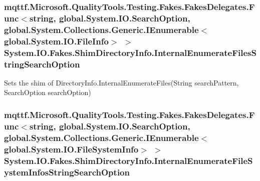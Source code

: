 \hypertarget{class_system_1_1_i_o_1_1_fakes_1_1_shim_directory_info_a39884c624b95796a109284b2d06c15fa}{
\subsubsection[{Internal\-Enumerate\-Files\-String\-Search\-Option}]{\setlength{\rightskip}{0pt plus 5cm}mqttf.\-Microsoft.\-Quality\-Tools.\-Testing.\-Fakes.\-Fakes\-Delegates.\-Func$<$string, global.\-System.\-I\-O.\-Search\-Option, global.\-System.\-Collections.\-Generic.\-I\-Enumerable$<$global.\-System.\-I\-O.\-File\-Info$>$ $>$ System.\-I\-O.\-Fakes.\-Shim\-Directory\-Info.\-Internal\-Enumerate\-Files\-String\-Search\-Option\hspace{0.3cm}{\ttfamily [set]}}}\label{class_system_1_1_i_o_1_1_fakes_1_1_shim_directory_info_a39884c624b95796a109284b2d06c15fa}


Sets the shim of Directory\-Info.\-Internal\-Enumerate\-Files(\-String search\-Pattern, Search\-Option search\-Option)

\hypertarget{class_system_1_1_i_o_1_1_fakes_1_1_shim_directory_info_ae33c09c51b32b3030587794fb99aa7b1}{
\subsubsection[{Internal\-Enumerate\-File\-System\-Infos\-String\-Search\-Option}]{\setlength{\rightskip}{0pt plus 5cm}mqttf.\-Microsoft.\-Quality\-Tools.\-Testing.\-Fakes.\-Fakes\-Delegates.\-Func$<$string, global.\-System.\-I\-O.\-Search\-Option, global.\-System.\-Collections.\-Generic.\-I\-Enumerable$<$global.\-System.\-I\-O.\-File\-System\-Info$>$ $>$ System.\-I\-O.\-Fakes.\-Shim\-Directory\-Info.\-Internal\-Enumerate\-File\-System\-Infos\-String\-Search\-Option\hspace{0.3cm}{\ttfamily [set]}}}\label{class_system_1_1_i_o_1_1_fakes_1_1_shim_directory_info_ae33c09c51b32b3030587794fb99aa7b1}


